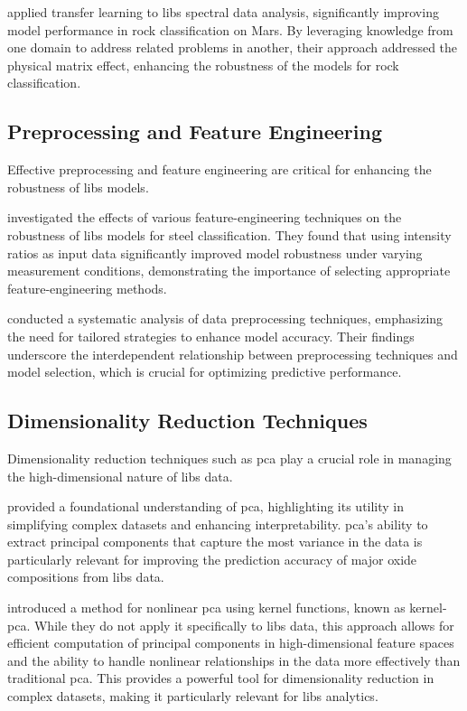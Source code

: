\citet{sunMachineLearningTransfer2021} applied transfer learning to \gls{libs} spectral data analysis, significantly improving model performance in rock classification on Mars.
By leveraging knowledge from one domain to address related problems in another, their approach addressed the physical matrix effect, enhancing the robustness of the models for rock classification.

\subsection{Preprocessing and Feature Engineering}
Effective preprocessing and feature engineering are critical for enhancing the robustness of \gls{libs} models.

\citet{jeonEffectsFeatureEngineering2024} investigated the effects of various feature-engineering techniques on the robustness of \gls{libs} models for steel classification.
They found that using intensity ratios as input data significantly improved model robustness under varying measurement conditions, demonstrating the importance of selecting appropriate feature-engineering methods.

\citet{Huang2015AnEA} conducted a systematic analysis of data preprocessing techniques, emphasizing the need for tailored strategies to enhance model accuracy.
Their findings underscore the interdependent relationship between preprocessing techniques and model selection, which is crucial for optimizing predictive performance.

\subsection{Dimensionality Reduction Techniques}
Dimensionality reduction techniques such as \gls{pca} play a crucial role in managing the high-dimensional nature of \gls{libs} data.

\citet{woldPrincipalComponentAnalysis1987} provided a foundational understanding of \gls{pca}, highlighting its utility in simplifying complex datasets and enhancing interpretability.
\gls{pca}'s ability to extract principal components that capture the most variance in the data is particularly relevant for improving the prediction accuracy of major oxide compositions from \gls{libs} data.

\citet{scholkopftKPCA} introduced a method for nonlinear \gls{pca} using kernel functions, known as \gls{kernel-pca}.
While they do not apply it specifically to \gls{libs} data, this approach allows for efficient computation of principal components in high-dimensional feature spaces and the ability to handle nonlinear relationships in the data more effectively than traditional \gls{pca}.
This provides a powerful tool for dimensionality reduction in complex datasets, making it particularly relevant for \gls{libs} analytics.

